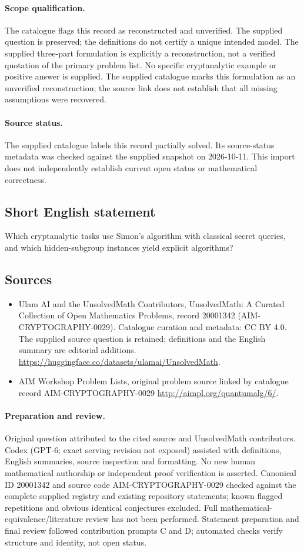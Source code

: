 \documentclass[11pt]{article}
\begin{document}
\paragraph{Scope qualification.}
The catalogue flags this record as reconstructed and unverified. The supplied question is preserved; the definitions do not certify a unique intended model. The supplied three-part formulation is explicitly a reconstruction, not a verified quotation of the primary problem list. No specific cryptanalytic example or positive answer is supplied.
The supplied catalogue marks this formulation as an unverified reconstruction; the source link does not establish that all missing assumptions were recovered.
\paragraph{Source status.}
The supplied catalogue labels this record partially solved. Its source-status metadata was checked against the supplied snapshot on 2026-10-11. This import does not independently establish current open status or mathematical correctness.
\subsection{Short English statement}
Which cryptanalytic tasks use Simon's algorithm with classical secret queries, and which hidden-subgroup instances yield explicit algorithms?
\subsection{Sources}
\begin{itemize}
\item[S1] Ulam AI and the UnsolvedMath Contributors, UnsolvedMath: A Curated Collection of Open Mathematics Problems, record 20001342 (AIM-CRYPTOGRAPHY-0029). Catalogue curation and metadata: CC BY 4.0. The supplied source question is retained; definitions and the English summary are editorial additions.
\url{https://huggingface.co/datasets/ulamai/UnsolvedMath}.
\item[S2] AIM Workshop Problem Lists, original problem source linked by catalogue record AIM-CRYPTOGRAPHY-0029
\url{http://aimpl.org/quantumalg/6/}.
\end{itemize}
\paragraph{Preparation and review.}
Original question attributed to the cited source and UnsolvedMath contributors. Codex (GPT-6; exact serving revision not exposed) assisted with definitions, English summaries, source inspection and formatting. No new human mathematical authorship or independent proof verification is asserted. Canonical ID 20001342 and source code AIM-CRYPTOGRAPHY-0029 checked against the complete supplied registry and existing repository statements; known flagged repetitions and obvious identical conjectures excluded. Full mathematical-equivalence/literature review has not been performed. Statement preparation and final review followed contribution prompts C and D; automated checks verify structure and identity, not open status.
\label{end:20001342}
\end{document}
